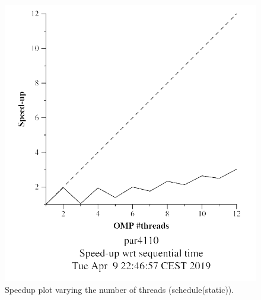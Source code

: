 \documentclass[12pt, a4paper]{article}
\begin{document}
\begin{figure}[H]
\begin{minipage}[b]{0.4\linewidth}
  \includegraphics[scale=0.5]{./mandel-omp-10000-strong-omp-for-static-speedup}
  \caption{Speedup plot varying the number of threads (schedule(static)).}
  \label{fig:mandel-omp-10000-strong-omp-for-static-speedup}
\end{minipage}
\end{figure}
\end{document}
